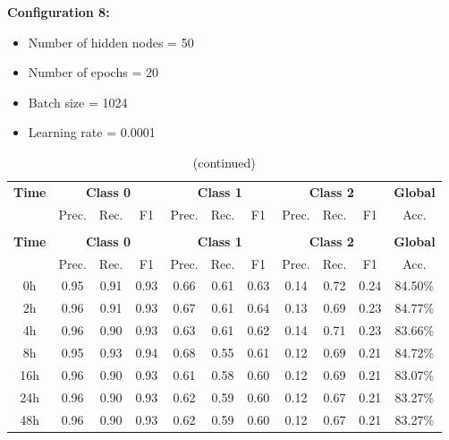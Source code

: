 \documentclass[12pt,oneside]{book} %
\begin{document}
\noindent \textbf{Configuration 8:}
\begin{multicols}{2}
    \begin{itemize}
        \item Number of hidden nodes = 50
        \item Number of epochs = 20
    \end{itemize}
    \begin{itemize}
         \item Batch size = 1024
         \item Learning rate = 0.0001
    \end{itemize}
\end{multicols}

\setlength\LTleft{1cm}
\begin{longtable}{ c ccc ccc ccc c}
\caption{Performance metrics of the LNN model for configuration 8} \\
\toprule
\textbf{Time} & \multicolumn{3}{c}{\textbf{Class 0}} & \multicolumn{3}{c}{\textbf{Class 1}} & \multicolumn{3}{c}{\textbf{Class 2}} & \textbf{Global} \\
               & Prec. & Rec. & F1  & Prec. & Rec. & F1   & Prec. & Rec. & F1  & Acc. \\
\midrule
\endfirsthead

\caption[]{(continued)} \\
\toprule
\textbf{Time} & \multicolumn{3}{c}{\textbf{Class 0}} & \multicolumn{3}{c}{\textbf{Class 1}} & \multicolumn{3}{c}{\textbf{Class 2}} & \textbf{Global} \\
               & Prec. & Rec. & F1  & Prec. & Rec. & F1   & Prec. & Rec. & F1  & Acc. \\
\midrule
\endhead

\bottomrule
\endfoot

\bottomrule
\endlastfoot

0h   & 0.95  & 0.91 & 0.93 & 0.66  & 0.61 & 0.63  & 0.14  & 0.72 & 0.24 & 84.50\% \\
2h   & 0.96  & 0.91 & 0.93 & 0.67  & 0.61 & 0.64  & 0.13  & 0.69 & 0.23 & 84.77\% \\
4h   & 0.96  & 0.90 & 0.93 & 0.63  & 0.61 & 0.62  & 0.14  & 0.71 & 0.23 & 83.66\% \\
8h   & 0.95  & 0.93 & 0.94 & 0.68  & 0.55 & 0.61  & 0.12  & 0.69 & 0.21 & 84.72\% \\
16h  & 0.96  & 0.90 & 0.93 & 0.61  & 0.58 & 0.60  & 0.12  & 0.69 & 0.21 & 83.07\% \\
24h  & 0.96  & 0.90 & 0.93 & 0.62  & 0.59 & 0.60  & 0.12  & 0.67 & 0.21 & 83.27\% \\
48h  & 0.96  & 0.90 & 0.93 & 0.62  & 0.59 & 0.60  & 0.12  & 0.67 & 0.21 & 83.27\% \\
\end{longtable}
\end{document}
